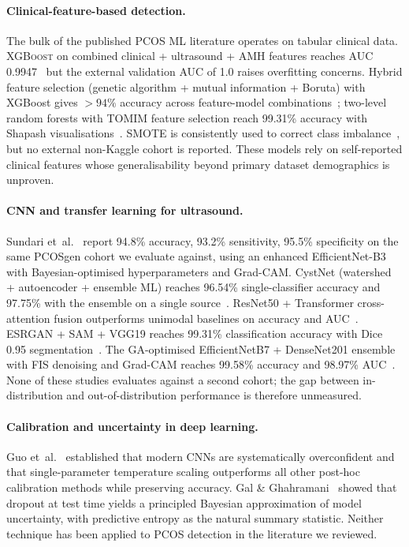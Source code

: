\documentclass[11pt,twocolumn]{article}
\newcommand{\PCOS}{PCOS}
\newcommand{\AUC}{AUC}
\newcommand{\GradCAM}{Grad-CAM}
\begin{document}
\paragraph{Clinical-feature-based detection.}
The bulk of the published \PCOS{} ML literature operates on tabular
clinical data. \textsc{XGBoost} on combined clinical + ultrasound + AMH
features reaches \AUC{} 0.9947~\cite{agirsoy2025} but the external
validation \AUC{} of 1.0 raises overfitting concerns. Hybrid feature
selection (genetic algorithm + mutual information + Boruta) with XGBoost
gives $>94\%$ accuracy across feature-model combinations~\cite{patil2025};
two-level random forests with TOMIM feature selection reach 99.31\%
accuracy with Shapash visualisations~\cite{mahesswari2024}. SMOTE is
consistently used to correct class imbalance~\cite{nsugbe2023}, but no
external non-Kaggle cohort is reported. These models rely on self-reported
clinical features whose generalisability beyond primary dataset
demographics is unproven.

\paragraph{CNN and transfer learning for ultrasound.}
Sundari et~al.~\cite{sundari2025} report 94.8\% accuracy, 93.2\%
sensitivity, 95.5\% specificity on the same \PCOS{}gen cohort we evaluate
against, using an enhanced EfficientNet-B3 with Bayesian-optimised
hyperparameters and \GradCAM{}. CystNet (watershed + autoencoder +
ensemble ML) reaches 96.54\% single-classifier accuracy and 97.75\% with
the ensemble on a single source~\cite{moral2024}. ResNet50 + Transformer
cross-attention fusion outperforms unimodal baselines on accuracy and
\AUC{}~\cite{lakshmi2026}. ESRGAN + SAM + VGG19 reaches 99.31\%
classification accuracy with Dice 0.95 segmentation~\cite{reka2025}. The
GA-optimised EfficientNetB7 + DenseNet201 ensemble with FIS denoising and
\GradCAM{} reaches 99.58\% accuracy and 98.97\% \AUC{}~\cite{ghosh2025}.
None of these studies evaluates against a second cohort; the gap between
in-distribution and out-of-distribution performance is therefore
unmeasured.

\paragraph{Calibration and uncertainty in deep learning.}
Guo et~al.~\cite{guo2017} established that modern CNNs are systematically
overconfident and that single-parameter temperature scaling outperforms
all other post-hoc calibration methods while preserving accuracy. Gal \&
Ghahramani~\cite{gal2016} showed that dropout at test time yields a
principled Bayesian approximation of model uncertainty, with predictive
entropy as the natural summary statistic. Neither technique has been
applied to \PCOS{} detection in the literature we reviewed.
\end{document}
